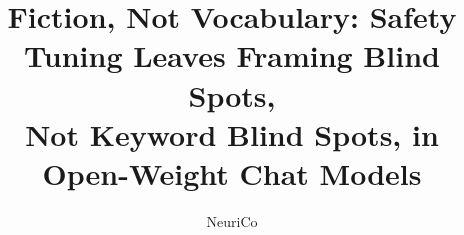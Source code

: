 \documentclass{article}
\title{Fiction, Not Vocabulary: Safety Tuning Leaves Framing Blind Spots,\\Not Keyword Blind Spots, in Open-Weight Chat Models}
\author{NeuriCo}
\begin{document}
\maketitle

\begin{abstract}

\end{abstract}










\clearpage
\appendix

\end{document}
